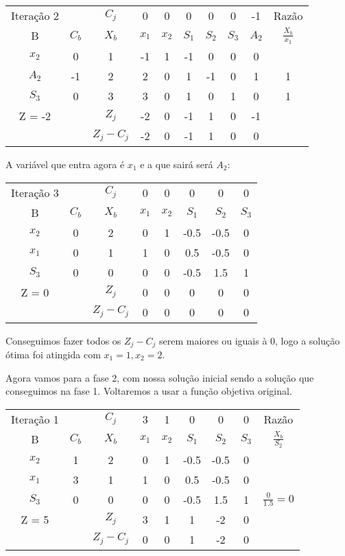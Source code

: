 \documentclass[11pt]{article}
\begin{document}
\begin{center}
\begin{tabular}{c c c c c c c c c c}
Iteração 2 &  & \(C_j\) & 0 & 0 & 0 & 0 & 0 & -1 & Razão\\
B & \(C_b\) & \(X_b\) & \(x_1\) & \(x_2\) & \(S_1\) & \(S_2\) & \(S_3\) & \(A_2\) & \(\frac{X_b}{x_1}\)\\
\(x_2\) & 0 & 1 & -1 & 1 & -1 & 0 & 0 & 0 & \\
\(A_2\) & -1 & 2 & 2 & 0 & 1 & -1 & 0 & 1 & 1\\
\(S_3\) & 0 & 3 & 3 & 0 & 1 & 0 & 1 & 0 & 1\\
Z = -2 &  & \(Z_j\) & -2 & 0 & -1 & 1 & 0 & -1 & \\
 &  & \(Z_j-C_j\) & -2 & 0 & -1 & 1 & 0 & 0 & \\
\end{tabular}
\end{center}

A variável que entra agora é \(x_1\) e a que sairá será \(A_2\):
\begin{center}
\begin{tabular}{c c c c c c c c}
Iteração 3 &  & \(C_j\) & 0 & 0 & 0 & 0 & 0\\
B & \(C_b\) & \(X_b\) & \(x_1\) & \(x_2\) & \(S_1\) & \(S_2\) & \(S_3\)\\
\(x_2\) & 0 & 2 & 0 & 1 & -0.5 & -0.5 & 0\\
\(x_1\) & 0 & 1 & 1 & 0 & 0.5 & -0.5 & 0\\
\(S_3\) & 0 & 0 & 0 & 0 & -0.5 & 1.5 & 1\\
Z = 0 &  & \(Z_j\) & 0 & 0 & 0 & 0 & 0\\
 &  & \(Z_j-C_j\) & 0 & 0 & 0 & 0 & 0\\
\end{tabular}
\end{center}

Conseguimos fazer todos os \(Z_j-C_j\) serem maiores ou iguais à 0, logo a solução ótima foi atingida com \(x_1=1,x_2=2\).

Agora vamos para a fase 2, com nossa solução inicial sendo a solução que conseguimos na fase 1. Voltaremos a usar a função objetiva original.

\begin{center}
\begin{tabular}{c c c c c c c c c}
Iteração 1 &  & \(C_j\) & 3 & 1 & 0 & 0 & 0 & Razão\\
B & \(C_b\) & \(X_b\) & \(x_1\) & \(x_2\) & \(S_1\) & \(S_2\) & \(S_3\) & \(\frac{X_b}{S_2}\)\\
\(x_2\) & 1 & 2 & 0 & 1 & -0.5 & -0.5 & 0 & \\
\(x_1\) & 3 & 1 & 1 & 0 & 0.5 & -0.5 & 0 & \\
\(S_3\) & 0 & 0 & 0 & 0 & -0.5 & 1.5 & 1 & \(\frac{0}{1.5} = 0\)\\
Z = 5 &  & \(Z_j\) & 3 & 1 & 1 & -2 & 0 & \\
 &  & \(Z_j-C_j\) & 0 & 0 & 1 & -2 & 0 & \\
\end{tabular}
\end{center}
\end{document}
